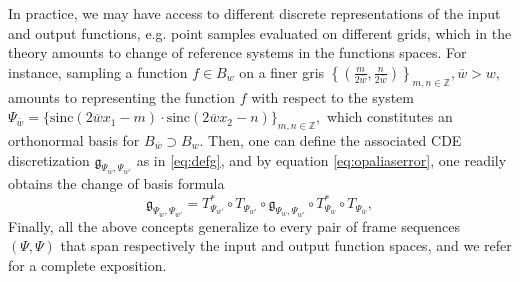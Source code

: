 \documentclass[reqno,10pt]{amsart}
\theoremstyle{plain}
\newcommand{\sinc}{\text{sinc}}
\theoremstyle{definition}
\newcommand{\bb}[1]{\mathbb{#1}}
\begin{document}
    \noindent In practice, we may have access to different discrete representations of the input and output functions, e.g. point samples evaluated on different grids, which in the theory amounts to change of reference systems in the functions spaces. For instance, sampling a function $f\in B_w$ on a finer gris $\left\{(\frac{m}{2\overline{w}},\frac{n}{2\overline{w}})\right\}_{m,n \in \bb Z},\overline{w} > w,$ amounts to representing the function $f$ with respect to the system $\Psi_{\overline{w}} = \{\sinc(2\overline{w}x_1 - m) \cdot \sinc(2\overline{w}x_2 - n)\}_{m,n \in \bb Z},$ which constitutes an orthonormal basis for $B_{\overline{w}} \supset B_w$. Then, one can define the associated CDE discretization $\mathfrak{g}_{\Psi_{\overline{w}},\Psi_{\overline{w}'}}$ as in \ref{eq:defg}, and by equation \ref{eq:opaliaserror}, one readily obtains the change of basis formula
    \begin{equation}
        \mathfrak{g}_{\Psi_{\overline{w}},\Psi_{\overline{w}'}} = T^*_{\Psi_{\overline{w}'}} \circ T_{\Psi_{w'}} \circ \mathfrak{g}_{\Psi_w,\Psi_{w'}} \circ T^*_{\Psi_w} \circ T_{\Psi_{\overline{w}}},
    \end{equation}
    Finally, all the above concepts generalize to every pair of frame sequences $(\Psi,\Psi)$ that span respectively the input and output function spaces, and we refer \cite{FB2023} for a complete exposition.
\end{document}
